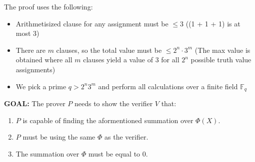\documentclass[11pt]{article}
\begin{document}
The proof uses the following:
\begin{itemize}
\item Arithmetisized clause for any assignment must be $\leq 3$ ((1 + 1 + 1) is at most 3)
\item There are $m$ clauses, so the total value must be $\leq 2^n \cdot 3^m$ (The max value is obtained where all $m$ clauses yield a value of $3$ for all $2^n$ possible truth value assignments)
\item We pick a prime $q > 2^n3^m$ and perform all calculations over a finite field $\mathbb{F}_{q}$
\end{itemize}
\newpage
\textbf{GOAL:} The prover $P$ needs to show the verifier $V$ that:
\begin{enumerate}
    \item $P$ is capable of finding the aformentioned summation over $\Phi(X)$.
    \item $P$ must be using the same $\Phi$ as the verifier.
    \item The summation over $\Phi$ must be equal to $0$.
\end{enumerate}
\end{document}
